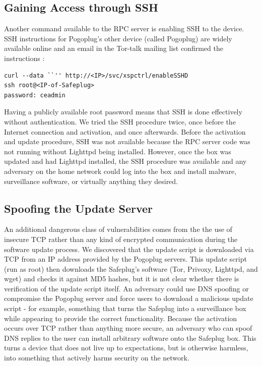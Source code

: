 \documentclass[letterpaper,twocolumn,10pt]{article}
\begin{document}
\subsection{Gaining Access through SSH}
\label{sec:SSH}
    Another command available to the RPC server is enabling SSH to the device.  SSH instructions for Pogoplug's other device (called Pogoplug) are widely available online and an email in the Tor-talk mailing list confirmed the instructions \cite{ceadmin}:
\begin{lstlisting}
curl --data ``'' http://<IP>/svc/xspctrl/enableSSHD
ssh root@<IP-of-Safeplug>
password: ceadmin
\end{lstlisting}

Having a publicly available root password means that SSH is done effectively without authentication.  We tried the SSH procedure twice, once before the Internet connection and activation, and once afterwards.  Before the activation and update procedure, SSH was not available because the RPC server code was not running without Lighttpd being installed.  However, once the box was updated and had Lighttpd installed, the SSH procedure was available and any adversary on the home network could log into the box and install malware, surveillance software, or virtually anything they desired.

\subsection{Spoofing the Update Server}
\label{dnsspoof}
An additional dangerous class of vulnerabilities comes from the the use of insecure TCP rather than any kind of encrypted communication during the software update process.  We discovered that the update script is downloaded via TCP from an IP address provided by the Pogoplug servers.  This update script (run as root) then downloads the Safeplug's software (Tor, Privoxy, Lighttpd, and wget) and checks it against MD5 hashes, but it is not clear whether there is verification of the update script itself.  An adversary could use DNS spoofing or compromise the Pogoplug server and force users to download a malicious update script - for example, something that turns the Safeplug into a surveillance box while appearing to provide the correct functionality.  Because the activation occurs over TCP rather than anything more secure, an adversary who can spoof DNS replies to the user can install arbitrary software onto the Safeplug box.  This turns a device that does not live up to expectations, but is otherwise harmless, into something that actively harms security on the network.
\end{document}
